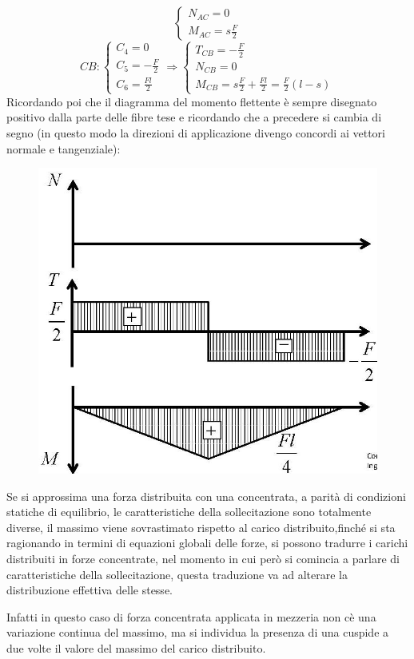 \documentclass{article}
\begin{document}
\begin{adjustwidth}{2in}{}
\[\begin{cases}
	N_{AC} = 0 \\
	
	M_{AC} =  s\frac{F}{2}
\end{cases}
	\] \hspace{0.5cm}
	\[
CB: 	\begin{cases}
		C_4 = 0 \\
		C_5 = -\frac{F}{2} \\
		C_6 = \frac{Fl}{2}
	\end{cases} \Rightarrow \begin{cases}
		T_{CB} = -\frac{F}{2} \\
		
		N_{CB} = 0 \\
		
		M_{CB} =  s\frac{F}{2}+ \frac{Fl}{2} = \frac{F}{2}(l-s)
	\end{cases}
	\] \newpage
	Ricordando poi che il diagramma del momento flettente è sempre disegnato positivo dalla parte delle fibre tese e ricordando che a precedere si cambia di segno (in questo modo la direzioni di applicazione divengo concordi ai vettori normale e tangenziale): 
	
\begin{figure}[H]
	\centering
	\includegraphics[width=0.3\linewidth]{"immagini/1.PARTE5_Pagina_20"}
	\end{figure}

	Se si approssima una forza distribuita con una concentrata, a parità di condizioni statiche di equilibrio, le caratteristiche della sollecitazione sono totalmente diverse, il massimo viene sovrastimato rispetto al carico distribuito,finché si sta ragionando in termini di equazioni globali delle forze, si possono tradurre i carichi distribuiti in forze concentrate, nel momento in cui però si comincia a parlare di caratteristiche della sollecitazione, questa traduzione va ad alterare la distribuzione effettiva delle stesse.\newline
	
	Infatti in questo caso di forza concentrata applicata in mezzeria non cè una variazione continua del massimo, ma si individua la presenza di una cuspide a due volte il valore del massimo del carico distribuito. \newline 
	

\end{adjustwidth}
\end{document}
